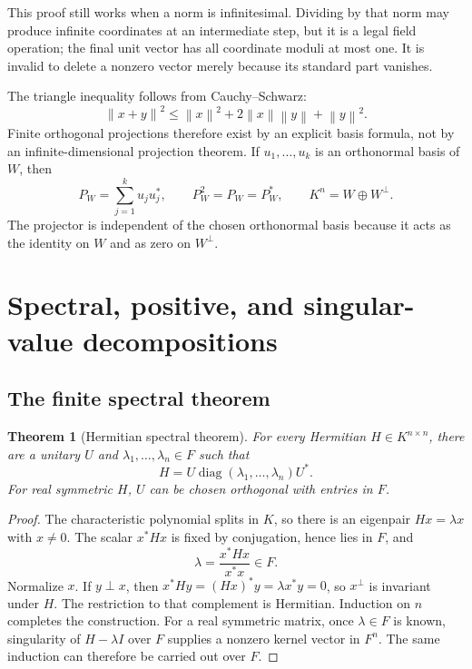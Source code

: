 \documentclass[11pt,a4paper]{article}
\numberwithin{equation}{section}
\newtheorem{theorem}{Theorem}[section]
\theoremstyle{definition}
\theoremstyle{remark}
\newcommand{\diag}{\operatorname{diag}}
\newcommand{\norm}[1]{\left\lVert#1\right\rVert}
\begin{document}
This proof still works when a norm is infinitesimal. Dividing by that norm
may produce infinite coordinates at an intermediate step, but it is a legal
field operation; the final unit vector has all coordinate moduli at most
one. It is invalid to delete a nonzero vector merely because its standard
part vanishes.

The triangle inequality follows from Cauchy--Schwarz:
\[
 \norm{x+y}^2
 \le\norm x^2+2\norm x\norm y+\norm y^2.
\]
Finite orthogonal projections therefore exist by an explicit basis formula,
not by an infinite-dimensional projection theorem. If $u_1,\ldots,u_k$ is
an orthonormal basis of $W$, then
\begin{equation}\label{eq:proj}
 P_W=\sum_{j=1}^ku_ju_j^*,\qquad
 P_W^2=P_W=P_W^*,\qquad K^n=W\oplus W^\perp.
\end{equation}
The projector is independent of the chosen orthonormal basis because it
acts as the identity on $W$ and as zero on $W^\perp$.

\section{Spectral, positive, and singular-value decompositions}\label{sec:spectral}

\subsection{The finite spectral theorem}
\begin{theorem}[Hermitian spectral theorem]\label{thm:spectral}
For every Hermitian $H\in K^{n\times n}$, there are a unitary $U$ and
$\lambda_1,\ldots,\lambda_n\in F$ such that
\[
 H=U\diag(\lambda_1,\ldots,\lambda_n)U^*.
\]
For real symmetric $H$, $U$ can be chosen orthogonal with entries in $F$.
\end{theorem}
\begin{proof}
The characteristic polynomial splits in $K$, so there is an eigenpair
$Hx=\lambda x$ with $x\ne0$. The scalar $x^*Hx$ is fixed by conjugation,
hence lies in $F$, and
\[
 \lambda=\frac{x^*Hx}{x^*x}\in F.
\]
Normalize $x$. If $y\perp x$, then
$x^*Hy=(Hx)^*y=\lambda x^*y=0$, so $x^\perp$ is invariant under $H$.
The restriction to that complement is Hermitian. Induction on $n$ completes
the construction. For a real symmetric matrix, once $\lambda\in F$ is
known, singularity of $H-\lambda I$ over $F$ supplies a nonzero kernel
vector in $F^n$. The same induction can therefore be carried out over $F$.
\end{proof}
\end{document}
